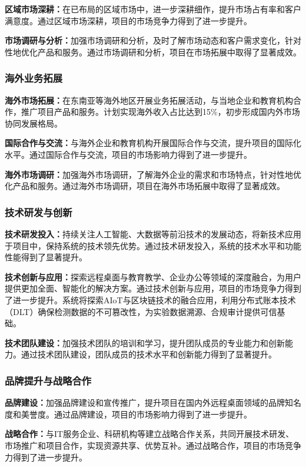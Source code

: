 \documentclass[12pt,a4paper]{article}
\begin{document}
\textbf{区域市场深耕：}在已布局的区域市场中，进一步深耕细作，提升市场占有率和客户满意度。通过区域市场深耕，项目的市场竞争力得到了进一步提升。

\textbf{市场调研与分析：}加强市场调研和分析，及时了解市场动态和客户需求变化，针对性地优化产品和服务。通过市场调研和分析，项目在市场拓展中取得了显著成效。

\subsubsection{海外业务拓展}
\textbf{海外市场拓展：}在东南亚等海外地区开展业务拓展活动，与当地企业和教育机构合作，推广项目产品和服务。计划实现海外收入占比达到15\%，初步形成国内外市场协同发展格局。

\textbf{国际合作与交流：}与海外企业和教育机构开展国际合作与交流，提升项目的国际化水平。通过国际合作与交流，项目的市场影响力得到了进一步提升。

\textbf{海外市场调研：}加强海外市场调研，了解海外企业的需求和市场特点，针对性地优化产品和服务。通过海外市场调研，项目在海外市场拓展中取得了显著成效。

\subsubsection{技术研发与创新}
\textbf{技术研发投入：}持续关注人工智能、大数据等前沿技术的发展动态，将新技术应用于项目中，保持系统的技术领先优势。通过技术研发投入，系统的技术水平和功能性能得到了显著提升。

\textbf{技术创新与应用：}探索远程桌面与教育教学、企业办公等领域的深度融合，为用户提供更加全面、智能化的解决方案。通过技术创新与应用，项目的市场竞争力得到了进一步提升。系统将探索AIoT与区块链技术的融合应用，利用分布式账本技术（DLT）确保检测数据的不可篡改性，为实验数据溯源、合规审计提供可信基础。

\textbf{技术团队建设：}加强技术团队的培训和学习，提升团队成员的专业能力和创新能力。通过技术团队建设，团队成员的技术水平和创新能力得到了显著提升。

\subsubsection{品牌提升与战略合作}
\textbf{品牌建设：}加强品牌建设和宣传推广，提升项目在国内外远程桌面领域的品牌知名度和美誉度。通过品牌建设，项目的市场影响力得到了进一步提升。

\textbf{战略合作：}与IT服务企业、科研机构等建立战略合作关系，共同开展技术研发、市场推广和项目合作，实现资源共享、优势互补。通过战略合作，项目的市场竞争力得到了进一步提升。
\end{document}
